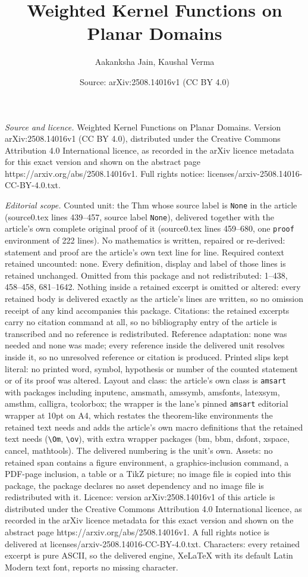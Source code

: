 \documentclass[10pt,a4paper]{amsart}
\title[Weighted Kernel Functions on Planar Domains]{Weighted Kernel Functions on Planar Domains}
\author{Aakanksha Jain, Kaushal Verma}
\date{Source: arXiv:2508.14016v1 (CC BY 4.0)}
\begin{document}
\maketitle

\noindent\emph{Source and licence.} Weighted Kernel Functions on Planar Domains. Version arXiv:2508.14016v1 (CC BY 4.0), distributed under the Creative Commons Attribution 4.0 International licence, as recorded in the arXiv licence metadata for this exact version and shown on the abstract page https://arxiv.org/abs/2508.14016v1. Full rights notice: licenses/arxiv-2508.14016-CC-BY-4.0.txt.\par\smallskip

\noindent\textit{Editorial scope.} Counted unit: the Thm whose source label is \texttt{None} in the article (source0.tex lines 439--457, source label \texttt{None}), delivered together with the article's own complete original proof of it (source0.tex lines 459--680, one \texttt{proof} environment of 222 lines). No mathematics is written, repaired or re-derived: statement and proof are the article's own text line for line. Required context retained uncounted: none. Every definition, display and label of those lines is retained unchanged. Omitted from this package and not redistributed: 1--438, 458--458, 681--1642. Nothing inside a retained excerpt is omitted or altered: every retained body is delivered exactly as the article's lines are written, so no omission receipt of any kind accompanies this package. Citations: the retained excerpts carry no citation command at all, so no bibliography entry of the article is transcribed and no reference is redistributed. Reference adaptation: none was needed and none was made; every reference inside the delivered unit resolves inside it, so no unresolved reference or citation is produced. Printed slips kept literal: no printed word, symbol, hypothesis or number of the counted statement or of its proof was altered. Layout and class: the article's own class is \texttt{amsart} with packages including inputenc, amsmath, amssymb, amsfonts, latexsym, amsthm, calligra, tcolorbox; the wrapper is the lane's pinned \texttt{amsart} editorial wrapper at 10pt on A4, which restates the theorem-like environments the retained text needs and adds the article's own macro definitions that the retained text needs (\texttt{\textbackslash Om}, \texttt{\textbackslash ov}), with extra wrapper packages (bm, bbm, dsfont, xspace, cancel, mathtools). The delivered numbering is the unit's own. Assets: no retained span contains a figure environment, a graphics-inclusion command, a PDF-page inclusion, a table or a TikZ picture; no image file is copied into this package, the package declares no asset dependency and no image file is redistributed with it. Licence: version arXiv:2508.14016v1 of this article is distributed under the Creative Commons Attribution 4.0 International licence, as recorded in the arXiv licence metadata for this exact version and shown on the abstract page https://arxiv.org/abs/2508.14016v1. A full rights notice is delivered at licenses/arxiv-2508.14016-CC-BY-4.0.txt. Characters: every retained excerpt is pure ASCII, so the delivered engine, XeLaTeX with its default Latin Modern text font, reports no missing character.
\end{document}
